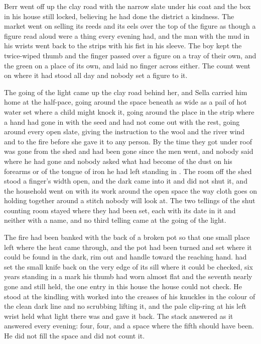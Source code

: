 Berr went off up the clay road with the narrow slate under his coat and the box in his house still locked, believing he had done the district a kindness. The market went on selling its reeds and its eels over the top of the figure as though a figure read aloud were a thing every evening had, and the man with the mud in his wrists went back to the strips with his fist in his sleeve. The boy kept the twice-wiped thumb and the finger passed over a figure on a tray of their own, and the green on a place of its own, and laid no finger across either. The count went on where it had stood all day and nobody set a figure to it.

\scenebreak

The going of the light came up the clay road behind her, and Sella carried him home at the half-pace, going around the space beneath  as wide as a pail of hot water set where a child might knock it, going around the place in the strip where a hand had gone in with the seed and had not come out with the rest, going around every open slate, giving the instruction to the wool and the river wind and to the fire before she gave it to any person. By the time they got under  roof  was gone from the shed and had been gone since the men went, and nobody said where he had gone and nobody asked what had become of the dust on his forearms or of the tongue of iron he had left standing in . The room off the shed stood a finger's width open, and the dark came into it and did not shut it, and the household went on with its work around the open space the way cloth goes on holding together around a stitch nobody will look at. The two tellings of the shut counting room stayed where they had been set, each with its date in it and neither with a name, and no third telling came at the going of the light.

The fire had been banked with the back of a broken pot so that one small place left where the heat came through, and the pot had been turned and set where it could be found in the dark, rim out and handle toward the reaching hand.  had set the small knife back on the very edge of its sill where it could be checked, six years standing in a mark his thumb had worn almost flat and the seventh nearly gone and still held, the one entry in this house the house could not check. He stood at the kindling with  worked into the creases of his knuckles in the colour of the clean dark line and no scrubbing lifting it, and the pale clip-ring at his left wrist held what light there was and gave it back. The stack answered as it answered every evening: four, four, and a space where the fifth should have been. He did not fill the space and did not count it.

